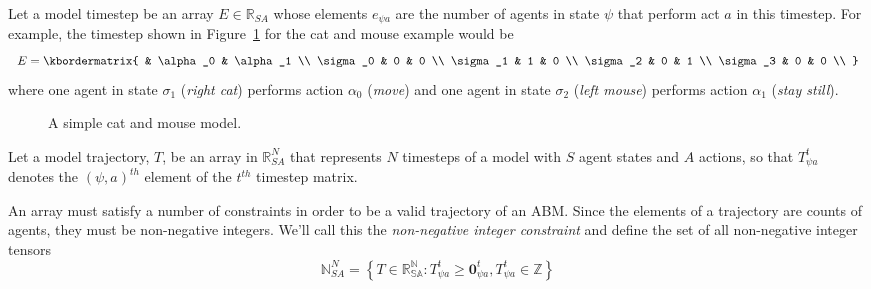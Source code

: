 \documentclass{article}
\begin{document}
Let a model timestep be an array $E \in \mathbb{R}_{SA}$ whose elements $e_{\psi a}$ are the number of agents in state $\psi$ that perform act $a$ in this timestep. For example, the timestep shown in Figure~\ref{fig:AB-MCMC-1} for the cat and mouse example would be
\[
E = \kbordermatrix{
	& \alpha_0 & \alpha_1 \\
	\sigma_0 & 0 & 0 \\
	\sigma_1 & 1 & 0 \\
	\sigma_2 & 0  & 1 \\
	\sigma_3 & 0 & 0 \\
}
\]
where one agent in state $\sigma_1$ (\textit{right cat}) performs action $\alpha_0$ (\textit{move}) and one agent in state $\sigma_2$ (\textit{left mouse}) performs action $\alpha_1$ (\textit{stay still}).

\begin{figure}[ht]
	\centering
	\caption{A simple cat and mouse model.\label{fig:AB-MCMC-1}}
\end{figure}

Let a model trajectory, $T$, be an array in $\mathbb{R}^N_{SA}$ that represents $N$ timesteps of a model with $S$ agent states and $A$ actions, so that $T^t_{\psi a}$ denotes the $(\psi, a)^{th}$ element of the $t^{th}$ timestep matrix.

An array must satisfy a number of constraints in order to be a valid trajectory of an ABM. Since the elements of a trajectory are counts of agents, they must be non-negative integers. We'll call this the \textit{non-negative integer constraint} and define the set of all non-negative integer tensors
\begin{equation}
\mathbb{N}^N_{SA} = \left\{ T \in \mathbb{R^N_{SA}}: T^t_{\psi a} \ge \mathbf{0}^t_{\psi a}, T^t_{\psi a} \in \mathbb{Z}\right\}
\label{nonNegativeInt}
\end{equation}
\end{document}
